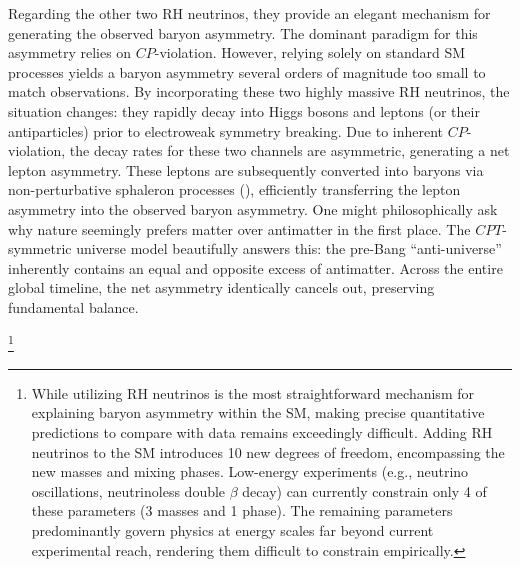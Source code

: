 \documentclass[12pt,a4paper]{report}
\let\cite\parencite
\begin{document}
Regarding the other two RH neutrinos, they provide an elegant mechanism for generating the observed baryon asymmetry. The dominant paradigm for this asymmetry relies on $CP$-violation. However, relying solely on standard SM processes yields a baryon asymmetry several orders of magnitude too small to match observations. By incorporating these two highly massive RH neutrinos, the situation changes: they rapidly decay into Higgs bosons and leptons (or their antiparticles) prior to electroweak symmetry breaking. Due to inherent $CP$-violation, the decay rates for these two channels are asymmetric, generating a net lepton asymmetry. These leptons are subsequently converted into baryons via non-perturbative sphaleron processes (\cite{PhysRevD.30.2212, PhysRevD.36.581}), efficiently transferring the lepton asymmetry into the observed baryon asymmetry. One might philosophically ask why nature seemingly prefers matter over antimatter in the first place. The $CPT$-symmetric universe model beautifully answers this: the pre-Bang ``anti-universe'' inherently contains an equal and opposite excess of antimatter. Across the entire global timeline, the net asymmetry identically cancels out, preserving fundamental balance.

\footnote{While utilizing RH neutrinos is the most straightforward mechanism for explaining baryon asymmetry within the SM, making precise quantitative predictions to compare with data remains exceedingly difficult. Adding RH neutrinos to the SM introduces 10 new degrees of freedom, encompassing the new masses and mixing phases. Low-energy experiments (e.g., neutrino oscillations, neutrinoless double $\beta$ decay) can currently constrain only 4 of these parameters (3 masses and 1 phase). The remaining parameters predominantly govern physics at energy scales far beyond current experimental reach, rendering them difficult to constrain empirically.}
\end{document}
